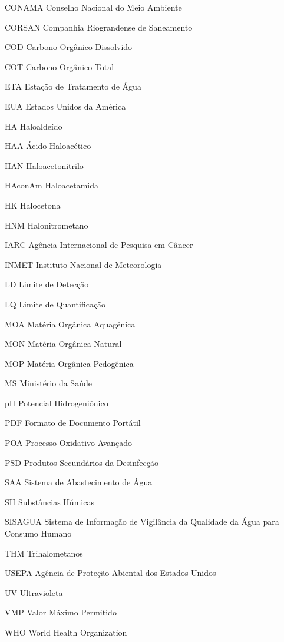 \begin{siglas}
\item[CONAMA] Conselho Nacional do Meio Ambiente
\item[CORSAN] Companhia Riograndense de Saneamento
\item[COD] Carbono Orgânico Dissolvido
\item[COT] Carbono Orgânico Total
\item[ETA] Estação de Tratamento de Água
\item[EUA] Estados Unidos da América
\item[HA] Haloaldeído 
\item[HAA] Ácido Haloacético
\item[HAN] Haloacetonitrilo
\item[HAconAm] Haloacetamida
\item[HK] Halocetona
\item[HNM] Halonitrometano
\item[IARC] Agência Internacional de Pesquisa em Câncer
\item[INMET] Instituto Nacional de Meteorologia
\item[LD] Limite de Detecção
\item[LQ] Limite de Quantificação
\item[MOA] Matéria Orgânica Aquagênica
\item[MON] Matéria Orgânica Natural
\item[MOP] Matéria Orgânica Pedogênica
\item[MS] Ministério da Saúde
\item[pH] Potencial Hidrogeniônico
\item[PDF] Formato de Documento Portátil
\item[POA] Processo Oxidativo Avançado
\item[PSD] Produtos Secundários da Desinfecção
\item[SAA] Sistema de Abastecimento de Água
\item[SH] Substâncias Húmicas
\item[SISAGUA] Sistema de Informação de Vigilância da Qualidade da Água para Consumo Humano
\item[THM] Trihalometanos
\item[USEPA] Agência de Proteção Abiental dos Estados Unidos 
\item[UV] Ultravioleta 
\item[VMP] Valor Máximo Permitido
\item[WHO] World Health Organization

\end{siglas}


